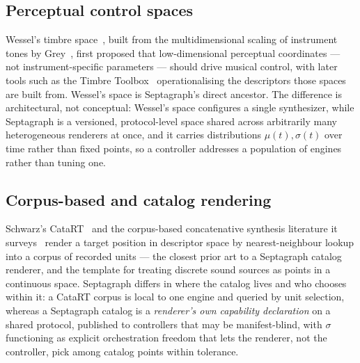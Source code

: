
\subsection{Perceptual control spaces}
Wessel's timbre space~\cite{wessel1979}, built from the multidimensional
scaling of instrument tones by Grey~\cite{grey1977}, first proposed that
low-dimensional perceptual coordinates --- not instrument-specific
parameters --- should drive musical control, with later tools such as the
Timbre Toolbox~\cite{peeters2011} operationalising the descriptors those
spaces are built from. Wessel's space is Septagraph's direct ancestor.
The difference is architectural, not conceptual: Wessel's space configures
a single synthesizer, while Septagraph is a versioned, protocol-level space
shared across arbitrarily many heterogeneous renderers at once, and it
carries distributions $\mu(t),\sigma(t)$ over time rather than fixed
points, so a controller addresses a population of engines rather than
tuning one.

\subsection{Corpus-based and catalog rendering}
Schwarz's CataRT~\cite{schwarz2006catart} and the corpus-based
concatenative synthesis literature it surveys~\cite{schwarz2007corpus}
render a target position in descriptor space by nearest-neighbour lookup
into a corpus of recorded units --- the closest prior art to a Septagraph
catalog renderer, and the template for treating discrete sound sources as
points in a continuous space. Septagraph differs in where the catalog
lives and who chooses within it: a CataRT corpus is local to one engine
and queried by unit selection, whereas a Septagraph catalog is a
\emph{renderer's own capability declaration} on a shared protocol,
published to controllers that may be manifest-blind, with $\sigma$
functioning as explicit orchestration freedom that lets the renderer, not
the controller, pick among catalog points within tolerance.

